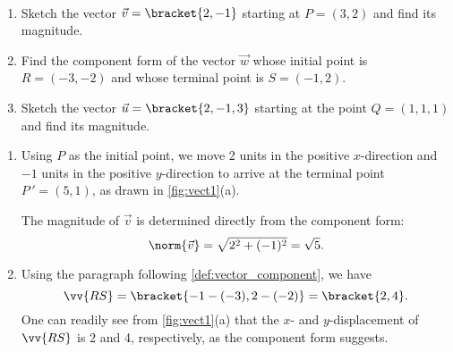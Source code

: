 \begin{example}\label{ex_vect1}
\mbox{}\\[-2\baselineskip]\parbox[t]{\linewidth}{%
\begin{enumerate}
	\item	Sketch the vector $\vec v=\bracket{2,-1}$ starting at $P=(3,2)$ and find its magnitude.
	\item	Find the component form of the vector $\vec w$ whose initial point is $R=(-3,-2)$ and whose terminal point is $S=(-1,2)$.
	\item	Sketch the vector $\vec u =\bracket{2,-1,3}$ starting at the point $Q = (1,1,1)$ and find its
magnitude.
\end{enumerate}}\vspace{0pt}
\solution
\begin{enumerate}
	\item Using $P$ as the initial point, we move 2 units in the positive $x$-direction and $-1$ units in the positive $y$-direction to arrive at the terminal point $P\,'=(5,1)$, as drawn in \autoref{fig:vect1}(a).
	
	The magnitude of $\vec v$ is determined directly from the component form:
	\[\norm{\vec v} =\sqrt{2^2+(-1)^2} = \sqrt{5}.\]
	
	\item	Using the paragraph following \autoref{def:vector_component}, we have
	\[\vv{RS} =\bracket{-1-(-3), 2-(-2)}=\bracket{2,4}.\]
	One can readily see from \autoref{fig:vect1}(a) that the $x$- and $y$-displacement of $\vv{RS}$ is 2 and 4, respectively, as the component form suggests.
	

\end{enumerate}
\end{example}
